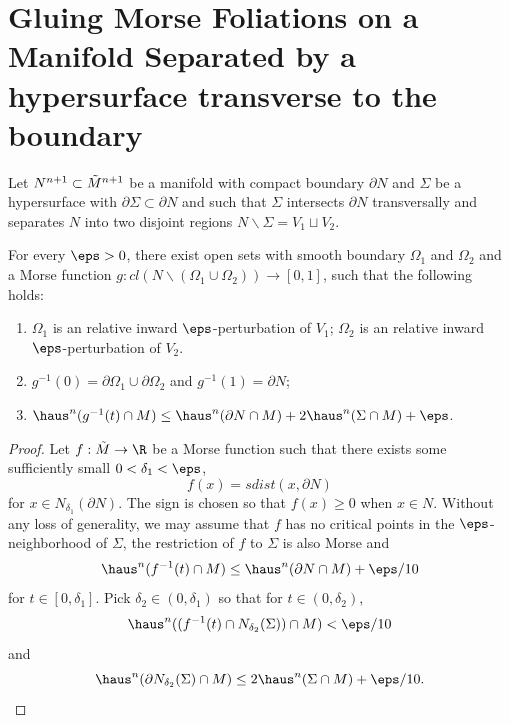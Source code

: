 \section[Gluing Morse Foliations on Separated Manifolds]{Gluing Morse Foliations on a Manifold Separated by a hypersurface transverse to the boundary}
\begin{lemma}\label{lem:morse-separate}
    Let $N^{n + 1}\subset \Tilde{M}^{n + 1}$ be a manifold with compact boundary $\partial N$ and $\Sigma$ be a hypersurface with $\partial\Sigma \subset \partial N$ and such that $\Sigma$ intersects $\partial N$ transversally and separates $N$ into two disjoint regions $N\backslash \Sigma = V_1 \sqcup V_2$. 

    For every $\eps > 0$, there exist open sets with smooth boundary $\Omega_1$ and $\Omega
    _2$ and a Morse function $g: cl(N\backslash(\Omega_1\cup\Omega_2)) \to [0, 1]$, such that the following holds:
    \begin{enumerate}
        \item[(1)] $\Omega
        _1$ is an relative inward $\eps$-perturbation of $V_1$; $\Omega_2$ is an relative inward $\eps$-perturbation of $V_2$. 
        \item[(2)] $g^{-1}(0) = \partial\Omega_1\cup\partial\Omega_2$ and $g^{-1}(1) = \partial N$;
        \item[(3)] $\haus^n(g^{-1}(t)\cap M) \leq \haus^n(\partial N\cap M) + 2\haus^n(\Sigma\cap M) + \eps$. 
    \end{enumerate}
    \begin{proof}
        Let $f: \Tilde{M} \to \R$ be a Morse function such that there exists some sufficiently small $0 < \delta_1 < \eps$, 
        \begin{equation*}
            f(x) = sdist(x, \partial N)
        \end{equation*}
        for $x \in N_{\delta_1}(\partial N)$. The sign is chosen so that $f(x) \geq 0$ when $x \in N$. Without any loss of generality, we may assume that $f$ has no critical points in the $\eps$-neighborhood of $\Sigma$, the restriction of $f$ to $\Sigma$ is also Morse and
        \begin{equation*}
            \haus^n(f^{-1}(t)\cap M) \leq \haus^n(\partial N\cap M) + \eps/10
        \end{equation*}
        for $t \in [0, \delta_1]$. Pick $\delta_2 \in (0, \delta_1)$ so that for $t \in (0, \delta_2)$,
        \begin{equation*}
            \haus^n((f^{-1}(t)\cap N_{\delta_2}(\Sigma))\cap M) < \eps/10
        \end{equation*}
        and
        \begin{equation*}
            \haus^n(\partial N_{\delta_2}(\Sigma)\cap M) \leq 2\haus^n(\Sigma\cap M) + \eps/10.
        \end{equation*}


\end{proof}
\end{lemma}
